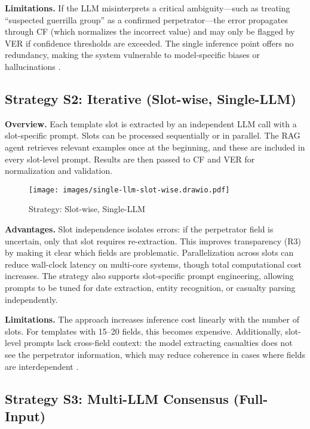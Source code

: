 \textbf{Limitations.}  
If the LLM misinterprets a critical ambiguity—such as treating ``suspected guerrilla group'' as a confirmed perpetrator—the error propagates through CF (which normalizes the incorrect value) and may only be flagged by VER if confidence thresholds are exceeded. The single inference point offers no redundancy, making the system vulnerable to model-specific biases or hallucinations \cite{du2020event}.

\subsection{Strategy S2: Iterative (Slot-wise, Single-LLM)}
\label{subsec:strategy-s2}

\textbf{Overview.}  
Each template slot is extracted by an independent LLM call with a slot-specific prompt. Slots can be processed sequentially or in parallel. The RAG agent retrieves relevant examples once at the beginning, and these are included in every slot-level prompt. Results are then passed to CF and VER for normalization and validation.

\begin{figure}[H]
  \centering
  \texttt{[image: images/single-llm-slot-wise.drawio.pdf]}
  \caption{Strategy: Slot-wise, Single-LLM}
  \label{fig:single-llm-slot-wise}
\end{figure}

\textbf{Advantages.}  
Slot independence isolates errors: if the perpetrator field is uncertain, only that slot requires re-extraction. This improves transparency (R3) by making it clear which fields are problematic. Parallelization across slots can reduce wall-clock latency on multi-core systems, though total computational cost increases. The strategy also supports slot-specific prompt engineering, allowing prompts to be tuned for date extraction, entity recognition, or casualty parsing independently.

\textbf{Limitations.}  
The approach increases inference cost linearly with the number of slots. For templates with 15–20 fields, this becomes expensive. Additionally, slot-level prompts lack cross-field context: the model extracting casualties does not see the perpetrator information, which may reduce coherence in cases where fields are interdependent \cite{sun2023slot}.

\subsection{Strategy S3: Multi-LLM Consensus (Full-Input)}
\label{subsec:strategy-s3}

